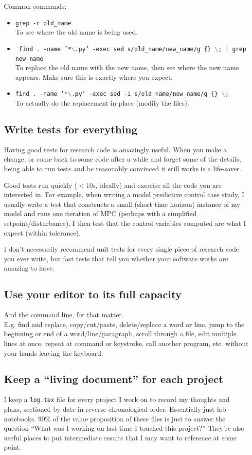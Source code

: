 \documentclass{article}
\begin{document}
Common commands:
\begin{itemize}
  \item \texttt{grep -r old\_name}\\
    To see where the old name is being used.
  \item \texttt{\small
      find . -name '*$\backslash$.py' -exec sed s/old\_name/new\_name/g \{\} $\backslash$; | grep new\_name
    }\\
    To replace the old name with the new name, then see where the new name appears.
    Make sure this is exactly where you expect.
  \item \texttt{find . -name '*$\backslash$.py' -exec sed -i s/old\_name/new\_name/g \{\} $\backslash$;
    }\\
    To actually do the replacement in-place (modify the files).
\end{itemize}

\subsection{Write tests for everything}
Having good tests for research code is amazingly useful.
When you make a change, or come back to some code after a while
and forget some of the details, being able to run tests and be reasonably
convinced it still works is a life-saver.

Good tests run quickly ($< 10$s, ideally) and exercise all the code you
are interested in. For example, when writing a model predictive control case
study, I usually write a test that constructs a small (short time horizon)
instance of my model and runs one iteration of MPC (perhaps with a simplified
setpoint/disturbance). I then test that the control variables computed are
what I expect (within tolerance).

I don't necessarily recommend unit tests for every single piece of research
code you ever write, but fast tests that tell you whether your software
works are amazing to have.

\subsection{Use your editor to its full capacity}
And the command line, for that matter.\\

E.g. find and replace, copy/cut/paste, delete/replace a word or line,
jump to the beginning or end of a word/line/paragraph, scroll through a file,
edit multiple lines at once, repeat at command or keystroke, call another
program, etc. without your hands leaving the keyboard.

\subsection{Keep a ``living document'' for each project}
I keep a \texttt{log.tex} file for every project I work on to record
my thoughts and plans, sectioned by date in reverse-chronological order.
Essentially just lab notebooks.
90\% of the value proposition of these files is just to answer the question
``What was I working on last time I touched this project?''
They're also useful places to put intermediate results that I may want to
reference at some point.
\end{document}
